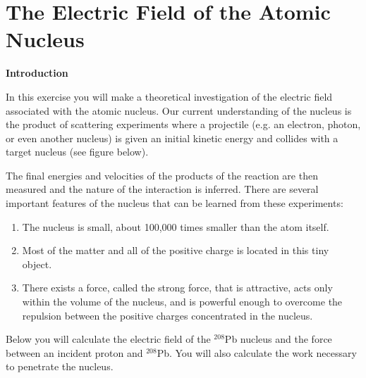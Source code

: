 
\section{The Electric Field of the Atomic Nucleus}

\makelabheader %

\textbf{Introduction}

In this exercise you will make a theoretical investigation of the
electric field associated with the atomic nucleus. Our current understanding
of the nucleus is the product of scattering experiments where a projectile
(e.g. an electron, photon, or even another nucleus) is given an initial
kinetic energy and collides with a target nucleus (see figure below). 

\vspace{0.3cm}
{\centering {} \par}
\vspace{0.3cm}

The final energies and velocities of the products of the reaction
are then measured and the nature of the interaction is inferred. There
are several important features of the nucleus that can be learned
from these experiments:

\begin{enumerate}
\item The nucleus is small, about 100,000 times smaller than the atom itself.
\item Most of the matter and all of the positive charge is located in this
tiny object.
\item There exists a force, called the strong force, that is attractive,
acts only within the volume of the nucleus, and is powerful enough
to overcome the repulsion between the positive charges concentrated
in the nucleus. 
\end{enumerate}
Below you will calculate the electric field of the \( ^{208} \)Pb
nucleus and the force between an incident proton and \( ^{208} \)Pb.
You will also calculate the work necessary to penetrate the nucleus.

